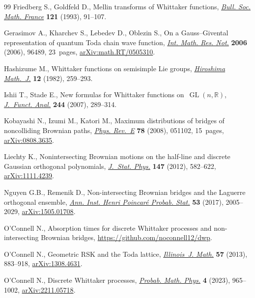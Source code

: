 \documentclass[pdftex]{sigma}
\theoremstyle{definition}
\begin{document}
\begin{thebibliography}{99}
Friedberg S., Goldfeld D., Mellin transforms of {W}hittaker functions,
 \href{https://doi.org/10.24033/bsmf.2201}{\textit{Bull. Soc. Math. France}}
 \textbf{121} (1993), 91--107.

Gerasimov A., Kharchev S., Lebedev D., Oblezin S., On a {G}auss--{G}ivental
 representation of quantum {T}oda chain wave function,
 \href{https://doi.org/10.1155/IMRN/2006/96489}{\textit{Int. Math. Res. Not.}}
 \textbf{2006} (2006), 96489, 23~pages,
 \href{http://arxiv.org/abs/math.RT/0505310}{arXiv:math.RT/0505310}.

Hashizume M., Whittaker functions on semisimple {L}ie groups,
 \href{https://doi.org/10.32917/hmj/1206133751}{\textit{Hiroshima Math.~J.}}
 \textbf{12} (1982), 259--293.

Ishii T., Stade E., New formulas for {W}hittaker functions
 on~{$\operatorname{GL}(n,\mathbb R)$},
 \href{https://doi.org/10.1016/j.jfa.2006.12.004}{\textit{J.~Funct. Anal.}}
 \textbf{244} (2007), 289--314.

Kobayashi N., Izumi M., Katori M., Maximum distributions of bridges of
 noncolliding {B}rownian paths,
 \href{https://doi.org/10.1103/PhysRevE.78.051102}{\textit{Phys. Rev.~E}}
 \textbf{78} (2008), 051102, 15~pages,
 \href{http://arxiv.org/abs/0808.3635}{arXiv:0808.3635}.

Liechty K., Nonintersecting {B}rownian motions on the half-line and discrete
 {G}aussian orthogonal polynomials,
 \href{https://doi.org/10.1007/s10955-012-0485-y}{\textit{J.~Stat. Phys.}}
 \textbf{147} (2012), 582--622,
 \href{http://arxiv.org/abs/1111.4239}{arXiv:1111.4239}.

Nguyen G.B., Remenik D., Non-intersecting {B}rownian bridges and the {L}aguerre
 orthogonal ensemble, \href{https://doi.org/10.1214/16-AIHP781}{\textit{Ann.
 Inst. Henri Poincar\'e Probab. Stat.}} \textbf{53} (2017), 2005--2029,
 \href{http://arxiv.org/abs/1505.01708}{arXiv:1505.01708}.

O'Connell N., Absorption times for discrete {W}hittaker processes and
 non-intersecting {B}rownian bridges,
 \url{https://github.com/noconnell12/dwp}.

O'Connell N., Geometric {RSK} and the {T}oda lattice,
 \href{https://doi.org/10.1215/ijm/1415023516}{\textit{Illinois~J. Math.}}
 \textbf{57} (2013), 883--918,
 \href{http://arxiv.org/abs/1308.4631}{arXiv:1308.4631}.

O'Connell N., Discrete {W}hittaker processes,
 \href{https://doi.org/10.2140/pmp.2023.4.965}{\textit{Probab. Math. Phys.}}
 \textbf{4} (2023), 965--1002,
 \href{http://arxiv.org/abs/2211.05718}{arXiv:2211.05718}.


\end{thebibliography}
\end{document}
